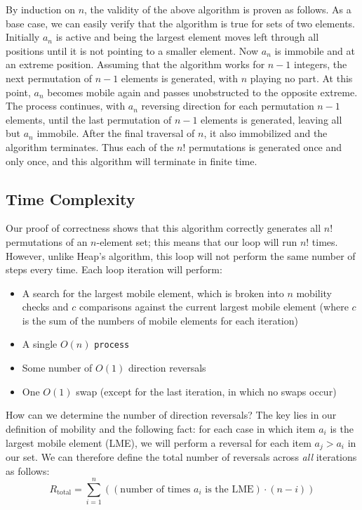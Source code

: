 \documentclass[10pt, oneside]{article}   	%
\begin{document}
By induction on $n$, the validity of the above algorithm is proven as follows. As a base case, we can easily verify that the algorithm is true for sets of two elements. Initially $a_{n}$ is active and being the largest element moves left through all positions until it is not pointing to a smaller element. Now $a_{n}$ is immobile and at an extreme position. Assuming that the algorithm works for $n-1$ integers, the next permutation of $n - 1$ elements is generated, with $n$ playing no part. At this point, $a_{n}$ becomes mobile again and passes unobstructed to the opposite extreme. The process continues, with $a_{n}$ reversing direction for each permutation $n- 1$ elements, until the last permutation of $n-1$ elements is generated, leaving all but $a_{n}$ immobile. After the final traversal of $n$, it also immobilized and the algorithm terminates. Thus each of the $n!$ permutations is generated once and only once, and this algorithm will terminate in finite time.

\subsection{Time Complexity}

Our proof of correctness shows that this algorithm correctly generates all $n!$ permutations of an $n$-element set; this means that our loop will run $n!$ times. However, unlike Heap's algorithm, this loop will not perform the same number of steps every time. Each loop iteration will perform:
\begin{itemize}
	\item A search for the largest mobile element, which is broken into $n$ mobility checks and $c$ comparisons against the current largest mobile element (where $c$ is the sum of the numbers of mobile elements for each iteration)
	\item A single $O(n)$ \texttt{process}
	\item Some number of $O(1)$ direction reversals
	\item One $O(1)$ swap (except for the last iteration, in which no swaps occur)
\end{itemize}
How can we determine the number of direction reversals? The key lies in our definition of mobility and the following fact: for each case in which item $a_{i}$ is the largest mobile element (LME), we will perform a reversal for each item $a_{j} > a_{i}$ in our set. We can therefore define the total number of reversals across \emph{all} iterations as follows:
\[
	R_{\text{total}} = \sum_{i = 1}^{n} \left( (\text{number of times $a_{i}$ is the LME}) \cdot (n - i) \right)
\]
\end{document}
